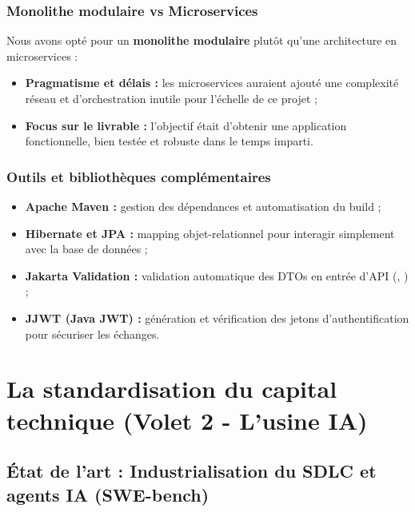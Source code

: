 \documentclass{tnreport}
\begin{document}
\subsection{Monolithe modulaire vs Microservices}
\label{subsec:choix_monolithe}

Nous avons opté pour un \textbf{monolithe modulaire} plutôt qu'une architecture en microservices :
\begin{itemize}
    \item \textbf{Pragmatisme et délais :} les microservices auraient ajouté une complexité réseau et d'orchestration inutile pour l'échelle de ce projet ;
    \item \textbf{Focus sur le livrable :} l'objectif était d'obtenir une application fonctionnelle, bien testée et robuste dans le temps imparti.
\end{itemize}

\subsection{Outils et bibliothèques complémentaires}
\label{subsec:outils_socle_technique}

\begin{itemize}
    \item \textbf{Apache Maven :} gestion des dépendances et automatisation du build ;
    \item \textbf{Hibernate et JPA :} mapping objet-relationnel pour interagir simplement avec la base de données ;
    \item \textbf{Jakarta Validation :} validation automatique des DTOs en entrée d'API (, ) ;
    \item \textbf{JJWT (Java JWT) :} génération et vérification des jetons d'authentification pour sécuriser les échanges.
\end{itemize}

\cleardoublepage

\chapter{La standardisation du capital technique (Volet 2 - L'usine IA)}
\label{chap:usine_ia}

\section{État de l'art : Industrialisation du SDLC et agents IA (SWE-bench)}
\label{sec:etat_de_l_art}
\end{document}
